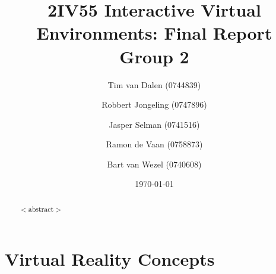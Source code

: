 \documentclass[a4paper,11pt]{article}
\title{
	2IV55 Interactive Virtual Environments: Final Report \\
	\small{Group 2}
}
\author{
	Tim van Dalen (0744839)
	\and
	Robbert Jongeling (0747896)
	\and
	Jasper Selman (0741516)
	\and
	Ramon de Vaan (0758873)
	\and
	Bart van Wezel (0740608)
}
\date{\today}
\begin{document}
	\maketitle
	
	\begin{abstract}
	$<$abstract$>$
	\end{abstract}
		
	\label{sec:intro}

	
	\section{Virtual Reality Concepts}
	\label{sec:vr}
	

	

	
	

	

	

	\begin{appendix}
	\label{tinyroom}
	\end{appendix}
\end{document}
